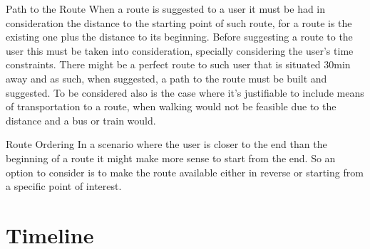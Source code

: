 \documentclass{article}
\begin{document}
        \begin{subsection}{Path to the Route}
            When a route is suggested to a user it must be had in consideration the distance to the starting point of such route, for a route
            is the existing one plus the distance to its beginning. Before suggesting a route to the user this must be taken into consideration,
            specially considering the user's time constraints. There might be a perfect route to such user that is situated 30min away and 
            as such, when suggested, a path to the route must be built and suggested. To be considered also is the case where it's justifiable 
            to include means of transportation to a route, when walking would not be feasible due to the distance and a bus or train would.  

        \end{subsection}
        
        \begin{subsection}{Route Ordering}            
            In a scenario where the user is closer to the end than the beginning of a route it 
            might make more sense to start from the end. So an option to consider is to make the route available either in reverse or starting from
            a specific point of interest.
        \end{subsection}        

    \newpage

    \section*{Timeline}

\end{document}
